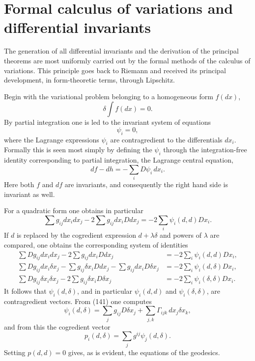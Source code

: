 \documentclass[12pt]{article}
\begin{document}
\newpage

\section{Formal calculus of variations and differential invariants}

The generation of all differential invariants and the derivation of the principal theorems are most uniformly carried out by the formal methods of the calculus of variations. This principle goes back to Riemann and received its principal development, in form-theoretic terms, through Lipschitz.

Begin with the variational problem belonging to a homogeneous form $f(dx)$,
\begin{equation}
  \delta \int f(dx)=0.                                            \tag{140}
\end{equation}
By partial integration one is led to the invariant system of equations
\[
  \psi_i=0,
\]
where the Lagrange expressions $\psi_i$ are contragredient to the differentials $dx_i$. Formally this is seen most simply by defining the $\psi_i$ through the integration-free identity corresponding to partial integration, the Lagrange central equation,
\[
  df-dh=-\sum_i D\psi_i\,dx_i.
\]
Here both $f$ and $df$ are invariants, and consequently the right hand side is invariant as well.

For a quadratic form one obtains in particular
\[
  \sum g_{ij}dx_i dx_j -2\sum g_{ij}dx_iDdx_j=-2\sum_i \psi_i(d,d)Dx_i.
\]
If $d$ is replaced by the cogredient expression $d+\lambda\delta$ and powers of $\lambda$ are compared, one obtains the corresponding system of identities
\begin{align*}
  \sum Dg_{ij}dx_i dx_j -2\sum g_{ij}dx_iDdx_j &=-2\sum_i\psi_i(d,d)Dx_i,\tag{141a}\\
  \sum Dg_{ij}dx_i\delta x_j-\sum g_{ij}\delta x_iDdx_j-\sum g_{ij}dx_iD\delta x_j &=-2\sum_i\psi_i(d,\delta)Dx_i,\tag{141b}\\
  \sum Dg_{ij}\delta x_i\delta x_j-2\sum g_{ij}\delta x_iD\delta x_j &=-2\sum_i\psi_i(\delta,\delta)Dx_i.\tag{141c}
\end{align*}
It follows that $\psi_i(d,\delta)$, and in particular $\psi_i(d,d)$ and $\psi_i(\delta,\delta)$, are contragredient vectors. From (141) one computes
\[
  \psi_i(d,\delta)=\sum_j g_{ij}D\delta x_j+\sum_{j,k}\Gamma_{ijk}\,dx_j\delta x_k,
\]
and from this the cogredient vector
\begin{equation}
  p_i(d,\delta)=\sum_j g^{ij}\psi_j(d,\delta).                   \tag{142}
\end{equation}
Setting $p(d,d)=0$ gives, as is evident, the equations of the geodesics.
\end{document}

